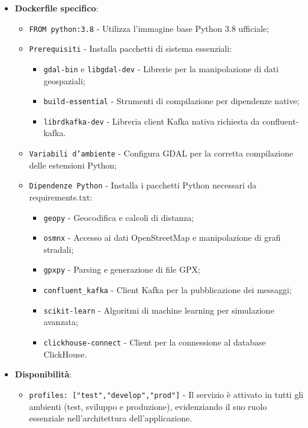 \documentclass[10pt]{article}
\begin{document}
\begin{itemize}
        \item \textbf{Dockerfile specifico}:
        \begin{itemize}
            \item \texttt{FROM python:3.8} - Utilizza l'immagine base Python 3.8 ufficiale;
            \item \texttt{Prerequisiti} - Installa pacchetti di sistema essenziali:
            \begin{itemize}
                \item \texttt{gdal-bin} e \texttt{libgdal-dev} - Librerie per la manipolazione di dati geospaziali;
                \item \texttt{build-essential} - Strumenti di compilazione per dipendenze native;
                \item \texttt{librdkafka-dev} - Libreria client Kafka nativa richiesta da confluent-kafka.
            \end{itemize}
            \item \texttt{Variabili d'ambiente} - Configura GDAL per la corretta compilazione delle estensioni Python;
            \item \texttt{Dipendenze Python} - Installa i pacchetti Python necessari da requirements.txt:
            \begin{itemize}
                \item \texttt{geopy} - Geocodifica e calcoli di distanza;
                \item \texttt{osmnx} - Accesso ai dati OpenStreetMap e manipolazione di grafi stradali;
                \item \texttt{gpxpy} - Parsing e generazione di file GPX;
                \item \texttt{confluent\_kafka} - Client Kafka per la pubblicazione dei messaggi;
                \item \texttt{scikit-learn} - Algoritmi di machine learning per simulazione avanzata;
                \item \texttt{clickhouse-connect} - Client per la connessione al database ClickHouse.
            \end{itemize}
        \end{itemize}
        
        \item \textbf{Disponibilità}:
        \begin{itemize}
            \item \texttt{profiles: ["test","develop","prod"]} - Il servizio è attivato in tutti gli ambienti (test, sviluppo e produzione), evidenziando il suo ruolo essenziale nell'architettura dell'applicazione.
        \end{itemize}
        \end{itemize}
\end{document}
